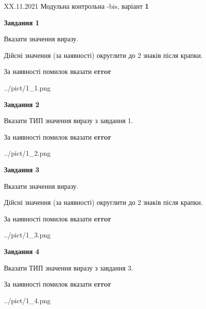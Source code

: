 \documentclass[11pt, ukrainian]{article}
\begin{document}
{XX.11.2021 Модульна контрольна -bis, варіант  \No \textbf { 1 }\par}
{
\begin {large}
{\begin {center}\textbf{Завдання 1}\end {center}}\par
Вказати значення виразу. \par
Дійсні значення (за наявності) округлити до 2 знаків після крапки. \par
За наявності помилок вказати \textbf{error}

\begin{center}
	{../pict/1_1.png}
\end{center}
\newpage

{\begin {center}\textbf{Завдання 2}\end {center}}\par
Вказати ТИП значення виразу з завдання 1. \par
За наявності помилок вказати \textbf{error}

\begin{center}
	{../pict/1_2.png}
\end{center}
\newpage

{\begin {center}\textbf{Завдання 3}\end {center}}\par
Вказати значення виразу. \par
Дійсні значення (за наявності) округлити до 2 знаків після крапки. \par
За наявності помилок вказати \textbf{error}

\begin{center}
	{../pict/1_3.png}
\end{center}
\newpage

{\begin {center}\textbf{Завдання 4}\end {center}}\par
Вказати ТИП значення виразу з завдання 3. \par
За наявності помилок вказати \textbf{error}

\begin{center}
	{../pict/1_4.png}
\end{center}
\newpage


\end{large}}
\end{document}
